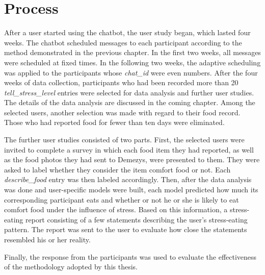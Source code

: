 \section{Process}
After a user started using the chatbot, the user study began, which lasted four weeks. The chatbot scheduled messages to each participant according to the method demonstrated in the previous chapter. In the first two weeks, all messages were scheduled at fixed times. In the following two weeks, the adaptive scheduling was applied to the participants whose \emph{chat\_id} were even numbers. After the four weeks of data collection, participants who had been recorded more than 20 \emph{tell\_stress\_level} entries were selected for data analysis and further user studies. The details of the data analysis are discussed in the coming chapter. Among the selected users, another selection was made with regard to their food record. Those who had reported food for fewer than ten days were eliminated.

The further user studies consisted of two parts. First, the selected users were invited to complete a survey in which each food item they had reported, as well as the food photos they had sent to Demezys, were presented to them. They were asked to label whether they consider the item comfort food or not. Each \emph{describe\_food} entry was then labeled accordingly. Then, after the data analysis was done and user-specific models were built, each model predicted how much its corresponding participant eats and whether or not he or she is likely to eat comfort food under the influence of stress. Based on this information, a stress-eating report consisting of a few statements describing the user's stress-eating pattern. The report was sent to the user to evaluate how close the statements resembled his or her reality.

Finally, the response from the participants was used to evaluate the effectiveness of the methodology adopted by this thesis.
